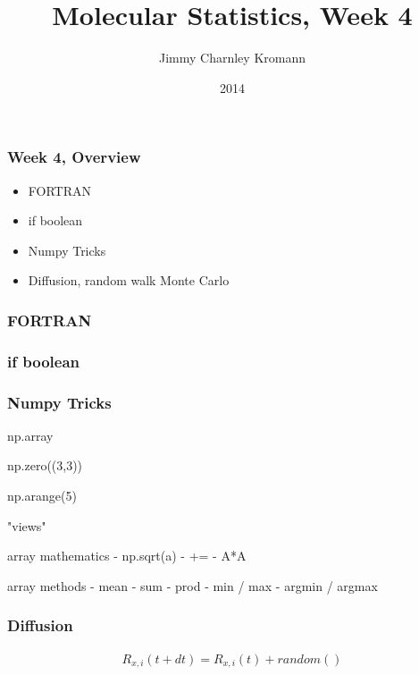 \documentclass{beamer}
\title[]{Molecular Statistics, Week 4}
\institute[University of Copenhagen]{Department of Chemistry \\ University of Copenhagen}
\author[Jimmy Charnley Kromann]{Jimmy Charnley Kromann}
\date{2014}
\begin{document}
\frame[plain]{\titlepage}


\begin{frame}[fragile]

    \frametitle{Week 4, Overview}

    \begin{itemize}

        \item FORTRAN

        \item if boolean

        \item Numpy Tricks

        \item Diffusion, random walk Monte Carlo

    \end{itemize}

\end{frame}


\begin{frame}[fragile]

    \frametitle{FORTRAN}

\end{frame}


\begin{frame}[fragile]

    \frametitle{if boolean}

\end{frame}


\begin{frame}[fragile]

    \frametitle{Numpy Tricks}

    np.array

    np.zero((3,3))

    np.arange(5)

    "views"

    array mathematics
    - np.sqrt(a)
    - +=
    - A*A

    array methods
    - mean
    - sum
    - prod
    - min / max
    - argmin / argmax

\end{frame}


\begin{frame}[fragile]

    \frametitle{Diffusion}

    \begin{align}
        R_{x,i}(t+dt) = R_{x,i}(t) + random()
    \end{align}

\end{frame}
\end{document}
